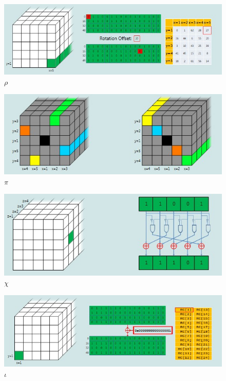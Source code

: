 \documentclass[a4paper, 14pt]{extarticle}
\begin{document}
\begin{enumerate}
        \begin{figure}[h]
            \centering
            \includegraphics[width=\textwidth]{img/S009.jpg}
            \caption{$\rho$}%
        \end{figure}

        \begin{figure}[h]
            \centering
            \includegraphics[width=\textwidth]{img/S010.jpg}
            \caption{$\pi$}%
        \end{figure}

        \begin{figure}[h]
            \centering
            \includegraphics[width=\textwidth]{img/S011.jpg}
            \caption{$\chi$}%
        \end{figure}

        \begin{figure}[h]
            \centering
            \includegraphics[width=\textwidth]{img/S012.jpg}
            \caption{$\iota$}%
        \end{figure}


\end{enumerate}
\end{document}
